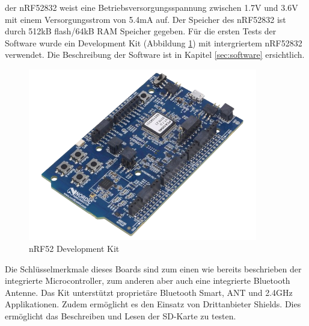 der nRF52832 weist eine Betriebsversorgungsspannung zwischen 1.7V und 3.6V mit einem Versorgungsstrom von 5.4mA auf. Der Speicher des nRF52832 ist durch 512kB flash/64kB RAM Speicher gegeben. 
Für die ersten Tests der Software wurde ein Development Kit (Abbildung \ref{fig:nRF52832-DK}) mit intergriertem nRF52832 verwendet. Die Beschreibung der Software ist in Kapitel \ref{sec:software} ersichtlich.
\begin{figure}[H]
	\begin{center}
		\includegraphics[width=100mm]{data/NRF52-DK.png}
		\caption[nRF52 Development Kit]{nRF52 Development Kit \cite{nRF52-DK}} %
		\label{fig:nRF52832-DK}
	\end{center}
\end{figure}
 Die Schlüsselmerkmale dieses Boards sind zum einen wie bereits beschrieben der integrierte Microcontroller, zum anderen aber auch eine integrierte Bluetooth Antenne. Das Kit unterstützt proprietäre Bluetooth Smart, ANT und 2.4GHz Applikationen. Zudem ermöglicht es den Einsatz von Drittanbieter Shields. Dies ermöglicht das Beschreiben und Lesen der SD-Karte zu testen.
